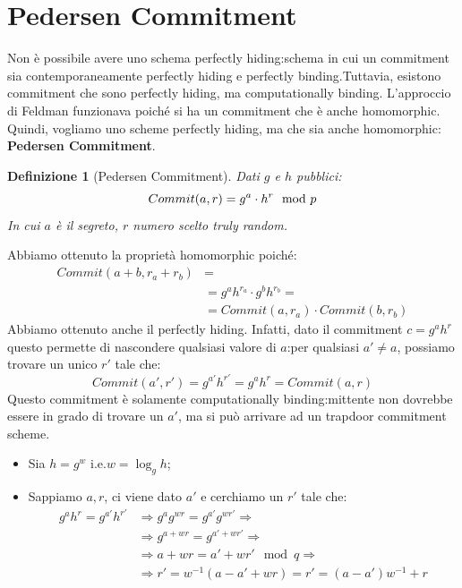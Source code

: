 \documentclass{book}
\newtheorem{Definizione}{\textbf{Definizione}}
\begin{document}
\section{Pedersen Commitment}
Non è possibile avere uno schema perfectly hiding:\@uno schema in cui un commitment sia contemporaneamente perfectly hiding e perfectly binding\@.\newline Tuttavia, esistono commitment che sono perfectly hiding, ma computationally binding\@. L'approccio di Feldman funzionava poiché si ha un commitment che è anche homomorphic\@.\newline
Quindi, vogliamo uno scheme perfectly hiding, ma che sia anche homomorphic: \textbf{Pedersen Commitment}\@.
\begin{Definizione}[Pedersen Commitment] Dati \(g\) e \(h\) pubblici\@:
    \begin{equation*}
        \centering
        Commit(a,r)=g^{a}\cdot h^{r}\mod{p}
    \end{equation*}
    In cui \(a\) è il segreto, \(r\) numero scelto truly random.
\end{Definizione}
Abbiamo ottenuto la proprietà homomorphic poiché:
\begin{align*}
    Commit(a+b,r_{a}+r_{b}) & =                                      \\
                            & =g^{a}h^{r_{a}}\cdot g^{b}h^{r_{b}}=   \\
                            & = Commit(a,r_{a})\cdot Commit(b,r_{b})
\end{align*}
Abbiamo ottenuto anche il perfectly hiding\@. Infatti, dato il commitment \(c=g^{a}h^{r}\) questo permette di nascondere qualsiasi valore di \(a\):\@ per qualsiasi \(a'\neq a\), possiamo trovare un unico \(r'\) tale che:\begin{equation*}
    Commit(a',r')=g^{a'}h^{r'}=g^{a}h^{r}=Commit(a,r)
\end{equation*}
Questo commitment è solamente computationally binding:\@il mittente non dovrebbe essere in grado di trovare un \(a'\), ma si può arrivare ad un trapdoor commitment scheme\@.
\begin{itemize}
    \item Sia \(h=g^{w}\) i.e.\(w=\log_{g}{h}\);
    \item Sappiamo \(a,r\), ci viene dato \(a'\) e cerchiamo un \(r'\) tale che:
          \begin{align*}
              g^{a}h^{r}=g^{a'}h^{r'} & \Longrightarrow g^{a}g^{wr}=g^{a'}g^{wr'}\Longrightarrow \\
                                      & \Longrightarrow g^{a+wr}=g^{a'+wr'}\Longrightarrow       \\
                                      & \Longrightarrow a+wr=a'+wr' \mod{q}\Longrightarrow       \\
                                      & \Longrightarrow r'=w^{-1}(a-a'+wr)=r'=(a-a')w^{-1}+r
          \end{align*}
\end{itemize}
\end{document}
